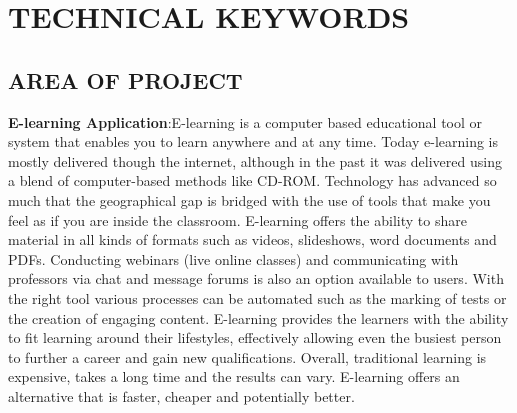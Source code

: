 \documentclass[oneside,a4paper,12pt]{report}
\begin{document}
{%
\newpage

\chapter{TECHNICAL KEYWORDS}
\newpage
\section{AREA OF PROJECT}
\hspace*{0.3in}\textbf{E-learning Application}:E-learning is a computer based educational tool or system that enables you to learn anywhere and at any time. Today e-learning is mostly delivered though the internet, although in the past it was delivered using a blend of computer-based methods like CD-ROM. Technology has  advanced so much that the geographical gap is bridged with the use of tools that make you feel as if you are inside the classroom. E-learning offers the ability to share material in all kinds of formats such as videos, slideshows, word documents and PDFs. Conducting webinars (live online classes) and communicating with professors via chat and message forums is also an option available to users. With the right tool various processes can be automated such as the marking of tests or the creation of engaging content. E-learning provides the learners with the ability to fit learning around their lifestyles, effectively allowing even the busiest person to further a career and gain new qualifications. Overall, traditional learning is expensive, takes a long time and the results can vary. E-learning offers an alternative that is faster, cheaper and potentially better.


}
\end{document}
